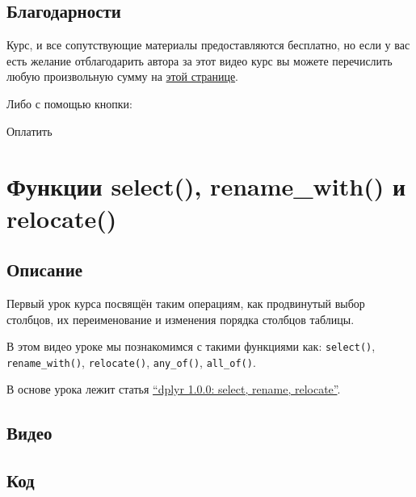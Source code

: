 \documentclass[
]{book}
\begin{document}
\hypertarget{ux431ux43bux430ux433ux43eux434ux430ux440ux43dux43eux441ux442ux438}{%
\section*{Благодарности}\label{ux431ux43bux430ux433ux43eux434ux430ux440ux43dux43eux441ux442ux438}}

Курс, и все сопутствующие материалы предоставляются бесплатно, но если у вас есть желание отблагодарить автора за этот видео курс вы можете перечислить любую произвольную сумму на \href{https://secure.wayforpay.com/payment/r4excel_users}{этой странице}.

Либо с помощью кнопки:

{Оплатить}

\hypertarget{ux444ux443ux43dux43aux446ux438ux438-select-rename_with-ux438-relocate}{%
\chapter{Функции select(), rename\_with() и relocate()}\label{ux444ux443ux43dux43aux446ux438ux438-select-rename_with-ux438-relocate}}

\hypertarget{ux43eux43fux438ux441ux430ux43dux438ux435}{%
\section{Описание}\label{ux43eux43fux438ux441ux430ux43dux438ux435}}

Первый урок курса посвящён таким операциям, как продвинутый выбор столбцов, их переименование и изменения порядка столбцов таблицы.

В этом видео уроке мы познакомимся с такими функциями как: \texttt{select()}, \texttt{rename\_with()}, \texttt{relocate()}, \texttt{any\_of()}, \texttt{all\_of()}.

В основе урока лежит статья \href{https://www.tidyverse.org/blog/2020/03/dplyr-1-0-0-select-rename-relocate/}{``dplyr 1.0.0: select, rename, relocate''}.

\hypertarget{ux432ux438ux434ux435ux43e}{%
\section{Видео}\label{ux432ux438ux434ux435ux43e}}

\hypertarget{ux43aux43eux434}{%
\section{Код}\label{ux43aux43eux434}}
\end{document}
